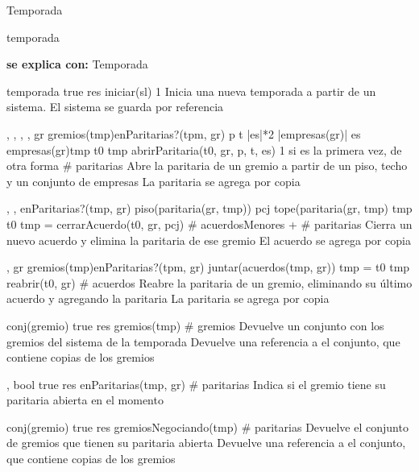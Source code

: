 \begin{interfaz}{Temporada}

\begin{iparamformales}{temporada}

\textbf{\large se explica con:} Temporada

\end{iparamformales}

{}{temporada}
{true}
{res \igobs iniciar(sl)}
{1}
{Inicia una nueva temporada a partir de un sistema.}
{El sistema se guarda por referencia}

{, , , , }{}
{gr \in gremios(tmp)\ly \neg enParitarias?(tpm, gr) \ly p \leq t \ly |es|*2 \leq |empresas(gr)| \ly es \subseteq empresas(gr)\ly tmp \igobs t0 }
{tmp \igobs abrirParitaria(t0, gr, p, t, es)  }
{1 si es la primera vez, de otra forma \# paritarias}
{Abre la paritaria de un gremio a partir de un piso, techo y un conjunto de empresas}
{La paritaria se agrega por copia}

{,  ,  }{}
{enParitarias?(tmp, gr) \ly piso(paritaria(gr, tmp)) \leq pcj \leq tope(paritaria(gr, tmp) \ly tmp \igobs t0 }
{tmp = cerrarAcuerdo(t0, gr, pcj)}
{ \# acuerdosMenores + \# paritarias}
{Cierra un nuevo acuerdo y elimina la paritaria de ese gremio}
{El acuerdo se agrega por copia}

{, }{}
{gr \in gremios(tmp)\ly \neg enParitarias?(tpm, gr) \ly \emptyset \neq  juntar(acuerdos(tmp, gr)) \ly tmp = t0 }
{tmp \igobs reabrir(t0, gr) }
{\# acuerdos}
{Reabre la paritaria de un gremio, eliminando su último acuerdo y agregando la paritaria}
{La paritaria se agrega por copia}

{}{conj(gremio)}
{true}
{res \igobs gremios(tmp) }
{ \# gremios }
{Devuelve un conjunto con los gremios del sistema de la temporada}
{Devuelve una referencia a el conjunto, que contiene copias de los gremios}

{, }{bool}
{true}
{ res \igobs enParitarias(tmp, gr) }
{\# paritarias}
{Indica si el gremio tiene su paritaria abierta en el momento}
{}

{}{conj(gremio)}
{true}
{res \igobs gremiosNegociando(tmp)}
{\# paritarias}
{Devuelve el conjunto de gremios que tienen su paritaria abierta }
{Devuelve una referencia a el conjunto, que contiene copias de los gremios}


\end{interfaz}
